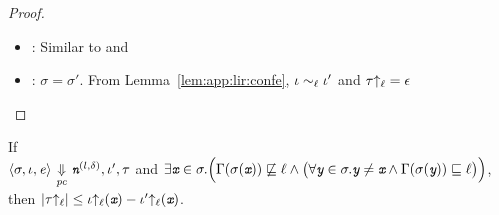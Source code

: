 \begin{proof}
\begin{itemize}[leftmargin=.5in]
  \item{}: Similar to  and 

  \item{}: $\sigma = \sigma'$. From Lemma~\ref{lem:app:lir:confe}, $\iota
    \sim_\ell \iota'$ and $\tau{\uparrow_\ell} = \epsilon$
  \end{itemize}
\end{proof}

\begin{myLemma}
\label{lem:app:lir:exptrli}
If \\
$\langle \sigma, \iota, \mathit{e} \rangle {~\underset{\mathit{pc}}{\Downarrow}~} \emph{\texttt{n}}^{(l, \delta)},
\iota', \tau$ and 
$\exists \emph{\texttt{x}} \in \sigma. \Big(\Gamma(\sigma(\emph{\texttt{x}}))
\not\sqsubseteq \ell \wedge \big(\forall \emph{\texttt{y}} \in
\sigma. \emph{\texttt{y}} \neq \emph{\texttt{x}} \wedge 
\Gamma(\sigma(\emph{\texttt{y}})) \sqsubseteq \ell\big)\Big)$, \\ then 
$|\tau{\uparrow_\ell}| \leq \iota{\uparrow_\ell}(\emph{\texttt{x}}) - \iota'{\uparrow_\ell}(\emph{\texttt{x}})$. 
\end{myLemma}
